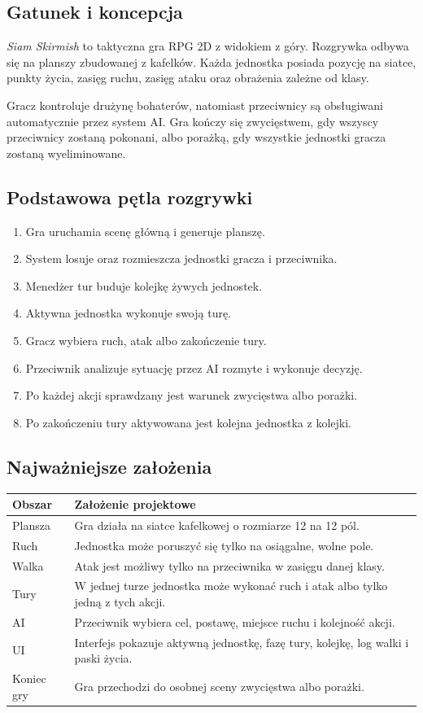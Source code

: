 \documentclass[12pt,a4paper]{article}
\begin{document}
\subsection{Gatunek i koncepcja}

\textit{Siam Skirmish} to taktyczna gra RPG 2D z widokiem z góry. Rozgrywka odbywa się na planszy zbudowanej z kafelków. Każda jednostka posiada pozycję na siatce, punkty życia, zasięg ruchu, zasięg ataku oraz obrażenia zależne od klasy.

Gracz kontroluje drużynę bohaterów, natomiast przeciwnicy są obsługiwani automatycznie przez system AI. Gra kończy się zwycięstwem, gdy wszyscy przeciwnicy zostaną pokonani, albo porażką, gdy wszystkie jednostki gracza zostaną wyeliminowane.

\subsection{Podstawowa pętla rozgrywki}

\begin{enumerate}
    \item Gra uruchamia scenę główną i generuje planszę.
    \item System losuje oraz rozmieszcza jednostki gracza i przeciwnika.
    \item Menedżer tur buduje kolejkę żywych jednostek.
    \item Aktywna jednostka wykonuje swoją turę.
    \item Gracz wybiera ruch, atak albo zakończenie tury.
    \item Przeciwnik analizuje sytuację przez AI rozmyte i wykonuje decyzję.
    \item Po każdej akcji sprawdzany jest warunek zwycięstwa albo porażki.
    \item Po zakończeniu tury aktywowana jest kolejna jednostka z kolejki.
\end{enumerate}

\subsection{Najważniejsze założenia}

\begin{longtable}{p{4cm} p{10cm}}
\toprule
\textbf{Obszar} & \textbf{Założenie projektowe} \\
\midrule
\endhead
Plansza & Gra działa na siatce kafelkowej o rozmiarze 12 na 12 pól. \\
Ruch & Jednostka może poruszyć się tylko na osiągalne, wolne pole. \\
Walka & Atak jest możliwy tylko na przeciwnika w zasięgu danej klasy. \\
Tury & W jednej turze jednostka może wykonać ruch i atak albo tylko jedną z tych akcji. \\
AI & Przeciwnik wybiera cel, postawę, miejsce ruchu i kolejność akcji. \\
UI & Interfejs pokazuje aktywną jednostkę, fazę tury, kolejkę, log walki i paski życia. \\
Koniec gry & Gra przechodzi do osobnej sceny zwycięstwa albo porażki. \\
\bottomrule
\end{longtable}
\end{document}
